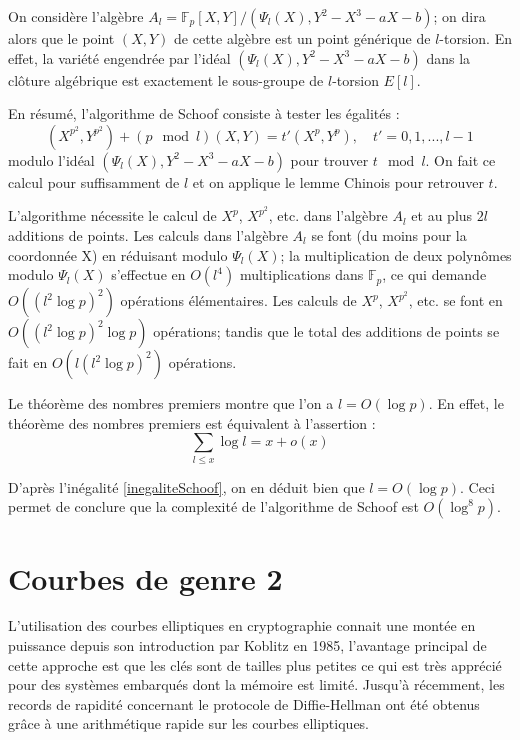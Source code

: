 \documentclass[a4paper,12pt]{article}
\theoremstyle{definition}
\theoremstyle{remark}
\numberwithin{equation}{section}
\begin{document}
On considère l'algèbre $A_l=\mathbb{F}_p[X,Y]/(\Psi_l(X),Y^2-X^3-aX-b)$; on dira alors que le point $(X,Y)$ de cette algèbre est un point générique de $l$-torsion. En effet, la variété engendrée par l'idéal $(\Psi_l(X),Y^2-X^3-aX-b)$ dans la clôture algébrique est exactement le sous-groupe de $l$-torsion $E[l]$.

En résumé, l'algorithme de Schoof consiste à tester les égalités :
\begin{equation}
\label{polCarFrob}
(X^{p^2},Y^{p^2}) + (p \mod l)(X,Y) = t'(X^p,Y^p), \quad t' = 0,1,...,l-1
\end{equation}
modulo l'idéal $(\Psi_l(X),Y^2-X^3-aX-b)$ pour trouver $t \mod l$. On fait ce calcul pour suffisamment de $l$ et on applique le lemme Chinois pour retrouver $t$.

L'algorithme nécessite le calcul de $X^p$, $X^{p^2}$, etc. dans l'algèbre $A_l$ et au plus $2l$ additions de points. Les calculs dans l'algèbre $A_l$ se font (du moins pour la coordonnée X) en réduisant modulo $\Psi_l(X)$; la multiplication de deux polynômes modulo $\Psi_l(X)$ s'effectue en $O(l^4)$ multiplications dans $\mathbb{F}_p$, ce qui demande $O((l^2\log p)^2)$ opérations élémentaires. Les calculs de $X^p$, $X^{p^2}$, etc. se font en $O((l^2\log p)^2\log p)$ opérations; tandis que le total des additions de points se fait en $O(l(l^2\log p)^2)$ opérations.

Le théorème des nombres premiers montre que l'on a $l = O(\log p)$. En effet, le théorème des nombres premiers est équivalent à l'assertion :
$$\sum_{l \leq x}\log l = x + o(x)$$

D'après l'inégalité \ref{inegaliteSchoof}, on en déduit bien que $l = O(\log p)$. Ceci permet de conclure que la complexité de l'algorithme de Schoof est $O(\log^8 p)$.

\section{Courbes de genre 2}

L'utilisation des courbes elliptiques en cryptographie connait une montée en puissance depuis son introduction par Koblitz en 1985, l'avantage principal de cette approche est que les clés sont de tailles plus petites ce qui est très apprécié pour des systèmes embarqués dont la mémoire est limité. Jusqu'à récemment, les records de rapidité concernant le protocole de Diffie-Hellman ont été obtenus grâce à une arithmétique rapide sur les courbes elliptiques.
\end{document}

